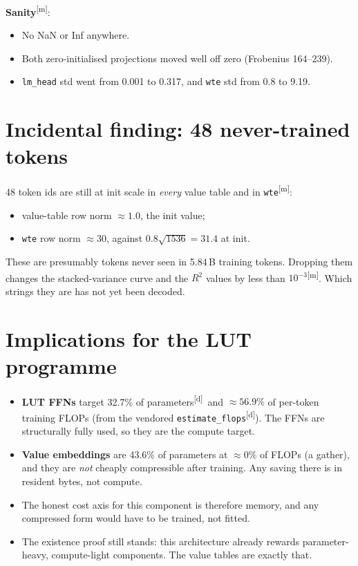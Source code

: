 \documentclass[11pt]{article}
\newcommand{\meas}{\textsuperscript{[m]}}   %
\newcommand{\der}{\textsuperscript{[d]}}    %
\begin{document}
\textbf{Sanity}\meas:
\begin{itemize}
\item No NaN or Inf anywhere.
\item Both zero-initialised projections moved well off zero (Frobenius 164--239).
\item \texttt{lm\_head} std went from 0.001 to 0.317, and \texttt{wte} std from 0.8 to 9.19.
\end{itemize}

\section{Incidental finding: 48 never-trained tokens}
48 token ids are still at init scale in \emph{every} value table and in \texttt{wte}\meas:
\begin{itemize}
\item value-table row norm ${\approx}1.0$, the init value;
\item \texttt{wte} row norm ${\approx}30$, against $0.8\sqrt{1536}=31.4$ at init.
\end{itemize}
These are presumably tokens never seen in 5.84\,B training tokens. Dropping them changes the stacked-variance curve and the $R^2$ values by less than $10^{-3}$\meas. Which strings they are has not yet been decoded.

\section{Implications for the LUT programme}
\begin{itemize}
\item \textbf{LUT FFNs} target 32.7\% of parameters\der\ and ${\approx}56.9\%$ of per-token training FLOPs (from the vendored \texttt{estimate\_flops}\der). The FFNs are structurally fully used, so they are the compute target.
\item \textbf{Value embeddings} are 43.6\% of parameters at ${\approx}0\%$ of FLOPs (a gather), and they are \emph{not} cheaply compressible after training. Any saving there is in resident bytes, not compute.
\item The honest cost axis for this component is therefore memory, and any compressed form would have to be trained, not fitted.
\item The existence proof still stands: this architecture already rewards parameter-heavy, compute-light components. The value tables are exactly that.
\end{itemize}
\end{document}
